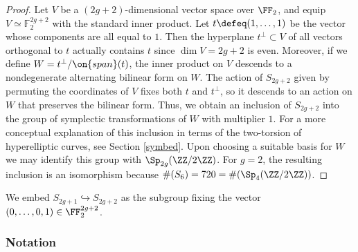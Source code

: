 \begin{proof} 
	Let $V$ be a $(2g+2)$-dimensional vector space over $\FF_2$, and equip $V \simeq \mathbb{F}_2^{2g+2}$ with the standard inner product. Let $t \defeq (1, \ldots, 1)$ be the vector whose components are all equal to $1$. Then the hyperplane $t^\perp \subset V$ of all vectors orthogonal to $t$ actually contains $t$ since $\dim V = 2g+2$ is even. Moreover, if we define $W = t^\perp / \on{span}(t)$, the inner product on $V$ descends to a nondegenerate alternating bilinear form on $W$. The action of $S_{2g+2}$ given by permuting the coordinates of $V$ fixes both $t$ and $t^\perp$, so it descends to an action on $W$ that preserves the bilinear form. 
Thus, we obtain an inclusion of $S_{2g+2}$ into the group of symplectic transformations of $W$ with multiplier $1$. For a more conceptual
explanation of this inclusion in terms of the two-torsion of hyperelliptic
curves, see Section \ref{symbed}.
Upon choosing a suitable basis for $W$ we may identify this group with $\Sp_{2g}(\ZZ / 2 \ZZ)$. For $g = 2$, the resulting inclusion is an isomorphism because $\#(S_6) = 720 = \#(\Sp_4(\ZZ / 2 \ZZ))$.
\end{proof}
We embed $S_{2g+1} \hookrightarrow S_{2g+2}$ as the subgroup fixing the vector $(0,\dots,0,1) \in \FF_2^{2g+2}$.

\subsubsection{Notation}
\label{subsection:notation}

